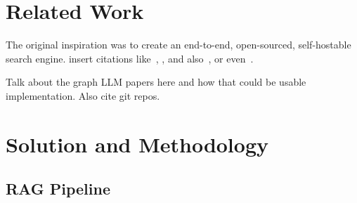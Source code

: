 \documentclass{scrartcl}
\begin{document}

\section{Related Work}
The original inspiration was to create an end-to-end, open-sourced, self-hostable search engine. 
insert citations like~\cite{byzantine-pki}, \cite{atomic-mcast-tcs01}, and also~\cite{sybilattack}, or even~\cite{psn-fail, verisign-fail}.

Talk about the graph LLM papers here and how that could be usable implementation. Also cite git repos.
\section{Solution and Methodology}
\subsection{RAG Pipeline}
\end{document}
